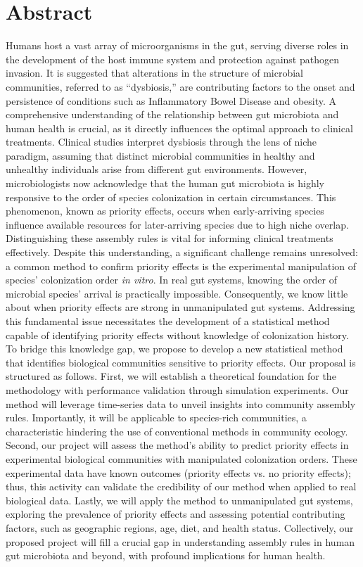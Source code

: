 \documentclass[12pt, class=article, crop=false]{standalone}
\begin{document}
\section*{Abstract}

\linenumbers
Humans host a vast array of microorganisms in the gut, serving diverse roles in the development of the host immune system and protection against pathogen invasion.
It is suggested that alterations in the structure of microbial communities, referred to as ``dysbiosis,'' are contributing factors to the onset and persistence of conditions such as Inflammatory Bowel Disease and obesity.
A comprehensive understanding of the relationship between gut microbiota and human health is crucial, as it directly influences the optimal approach to clinical treatments.
Clinical studies interpret dysbiosis through the lens of niche paradigm, assuming that distinct microbial communities in healthy and unhealthy individuals arise from different gut environments.
However, microbiologists now acknowledge that the human gut microbiota is highly responsive to the order of species colonization in certain circumstances.
This phenomenon, known as priority effects, occurs when early-arriving species influence available resources for later-arriving species due to high niche overlap.
Distinguishing these assembly rules is vital for informing clinical treatments effectively.
Despite this understanding, a significant challenge remains unresolved: a common method to confirm priority effects is the experimental manipulation of species' colonization order \textit{in vitro}.
In real gut systems, knowing the order of microbial species' arrival is practically impossible.
Consequently, we know little about when priority effects are strong in unmanipulated gut systems.
Addressing this fundamental issue necessitates the development of a statistical method capable of identifying priority effects without knowledge of colonization history.
To bridge this knowledge gap, we propose to develop a new statistical method that identifies biological communities sensitive to priority effects.
Our proposal is structured as follows.
First, we will establish a theoretical foundation for the methodology with performance validation through simulation experiments.
Our method will leverage time-series data to unveil insights into community assembly rules. Importantly, it will be applicable to species-rich communities, a characteristic hindering the use of conventional methods in community ecology.
Second, our project will assess the method's ability to predict priority effects in experimental biological communities with manipulated colonization orders.
These experimental data have known outcomes (priority effects vs. no priority effects); thus, this activity can validate the credibility of our method when applied to real biological data.
Lastly, we will apply the method to unmanipulated gut systems, exploring the prevalence of priority effects and assessing potential contributing factors, such as geographic regions, age, diet, and health status.
Collectively, our proposed project will fill a crucial gap in understanding assembly rules in human gut microbiota and beyond, with profound implications for human health.
\end{document}
